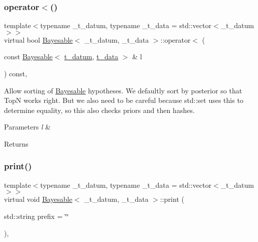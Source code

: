 \mbox{\label{class_bayesable_aae3f461c90ffd2a4b7b3e5418cbb1054}} 
\subsubsection{\texorpdfstring{operator$<$()}{operator<()}}
{\footnotesize\ttfamily template$<$typename \+\_\+t\+\_\+datum, typename \+\_\+t\+\_\+data = std\+::vector$<$\+\_\+t\+\_\+datum$>$$>$ \\
virtual bool \hyperlink{class_bayesable}{Bayesable}$<$ \+\_\+t\+\_\+datum, \+\_\+t\+\_\+data $>$\+::operator$<$ (\begin{DoxyParamCaption}\item[{const \hyperlink{class_bayesable}{Bayesable}$<$ \hyperlink{class_bayesable_a7c93a2eeab708378eb321745908718d4}{t\+\_\+datum}, \hyperlink{class_bayesable_a70a593a67c7d43239ecc06bb4fd06a6b}{t\+\_\+data} $>$ \&}]{l }\end{DoxyParamCaption}) const\hspace{0.3cm}{\ttfamily [inline]}, {\ttfamily [virtual]}}

Allow sorting of \hyperlink{class_bayesable}{Bayesable} hypotheses. We defaultly sort by posterior so that TopN works right. But we also need to be careful because std\+::set uses this to determine equality, so this also checks priors and then hashes. 
\begin{DoxyParams}{Parameters}
{\em l} & \\
\hline
\end{DoxyParams}
\begin{DoxyReturn}{Returns}

\end{DoxyReturn}
\mbox{\label{class_bayesable_a3f31fa34270083429fb23da21ad50432}} 
\subsubsection{\texorpdfstring{print()}{print()}}
{\footnotesize\ttfamily template$<$typename \+\_\+t\+\_\+datum, typename \+\_\+t\+\_\+data = std\+::vector$<$\+\_\+t\+\_\+datum$>$$>$ \\
virtual void \hyperlink{class_bayesable}{Bayesable}$<$ \+\_\+t\+\_\+datum, \+\_\+t\+\_\+data $>$\+::print (\begin{DoxyParamCaption}\item[{std\+::string}]{prefix = {\ttfamily \char`\"{}\char`\"{}} }\end{DoxyParamCaption})\hspace{0.3cm}{\ttfamily [inline]}, {\ttfamily [virtual]}}

